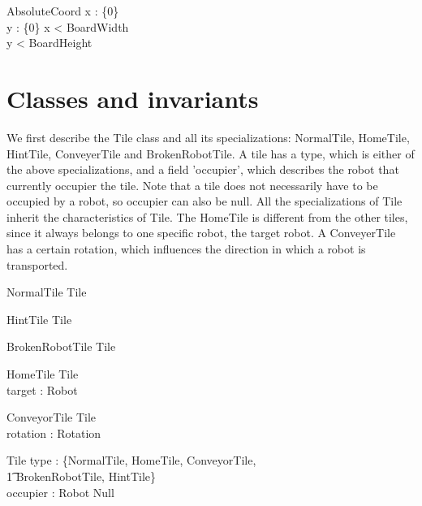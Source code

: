 \documentclass[12pt]{article}
\begin{document}
\begin{schema}{AbsoluteCoord}
x : \nat \cup \{0\} \\
y : \nat \cup \{0\}
\where
x < BoardWidth \\
y < BoardHeight
\end{schema}


\section{Classes and invariants}
We first describe the Tile class and all its specializations: NormalTile, HomeTile, HintTile, ConveyerTile and BrokenRobotTile. A tile has a type, which is either of the above specializations, and a field 'occupier', which describes the robot that currently occupier the tile. Note that a tile does not necessarily have to be occupied by a robot, so occupier can also be null. All the specializations of Tile inherit the characteristics of Tile. The HomeTile is different from the other tiles, since it always belongs to one specific robot, the target robot. A ConveyerTile has a certain rotation, which influences the direction in which a robot is transported.

\begin{schema}{NormalTile}
Tile
\end{schema}

\begin{schema}{HintTile}
Tile
\end{schema}

\begin{schema}{BrokenRobotTile}
Tile
\end{schema}

\begin{schema}{HomeTile}
Tile \\
target : Robot
\end{schema}

\begin{schema}{ConveyorTile}
Tile \\
rotation : Rotation
\end{schema}

\begin{schema}{Tile}
type : \{NormalTile, HomeTile, ConveyorTile, \\ \t1 BrokenRobotTile, HintTile\} \\
occupier : Robot \cup Null
\end{schema}
\end{document}
